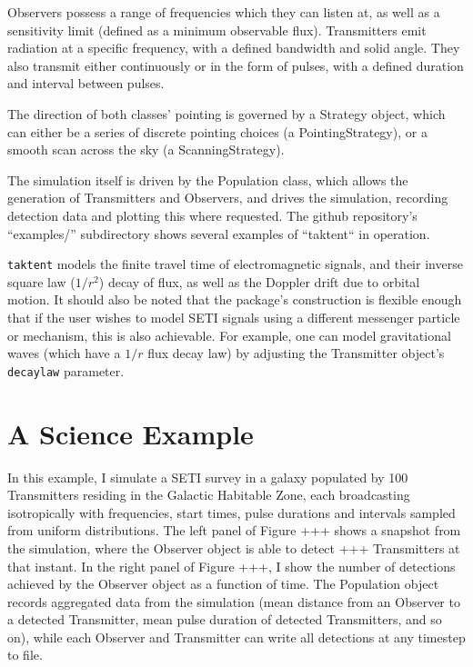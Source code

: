 \documentclass[RNAAS]{aastex62}
\begin{document}
Observers possess a range of frequencies which they can listen at, as well as a sensitivity limit (defined as a minimum observable flux).  Transmitters emit radiation at a specific frequency, with a defined bandwidth and solid angle.  They also transmit either continuously or in the form of pulses, with a defined duration and interval between pulses.

The direction of both classes' pointing is governed by a Strategy object, which can either be a series of discrete pointing choices (a PointingStrategy), or a smooth scan across the sky (a ScanningStrategy).

The simulation itself is driven by the Population class, which allows the generation of Transmitters and Observers, and drives the simulation, recording detection data and plotting this where requested.  The github repository's ``examples/'' subdirectory shows several examples of ``taktent`` in operation.

\texttt{taktent} models the finite travel time of electromagnetic signals, and their inverse square law ($1/r^2$) decay of flux, as well as the Doppler drift due to orbital motion.  It should also be noted that the package's construction is flexible enough that if the user wishes to model SETI signals using a different messenger particle or mechanism, this is also achievable.  For example, one can model gravitational waves (which have a $1/r$ flux decay law) by adjusting the Transmitter object's \texttt{decaylaw} parameter.

\section{A Science Example}

\noindent In this example, I simulate a SETI survey in a galaxy populated by 100 Transmitters residing in the Galactic Habitable Zone, each broadcasting isotropically with frequencies, start times, pulse durations and intervals sampled from uniform distributions.  The left panel of Figure +++ shows a snapshot from the simulation, where the Observer object is able to detect  +++ Transmitters at that instant.  In the right panel of Figure +++, I show the number of detections achieved by the Observer object as a function of time.  The Population object records aggregated data from the simulation (mean distance from an Observer to a detected Transmitter, mean pulse duration of detected Transmitters, and so on), while each Observer and Transmitter can write all detections at any timestep to file.
\end{document}
